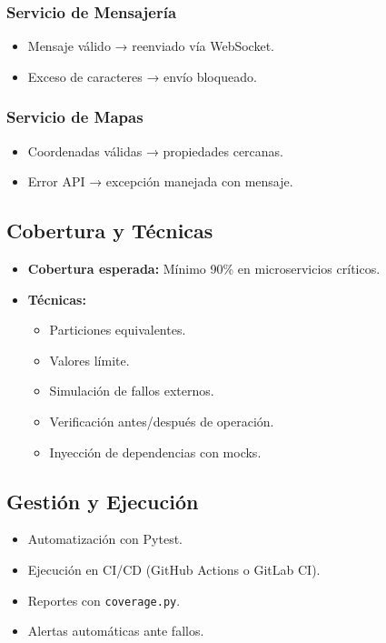 		\subsubsection*{Servicio de Mensajería}
			\begin{itemize}
				\item Mensaje válido → reenviado vía WebSocket.
				\item Exceso de caracteres → envío bloqueado.
			\end{itemize}
		
		\subsubsection*{Servicio de Mapas}
			\begin{itemize}
				\item Coordenadas válidas → propiedades cercanas.
				\item Error API → excepción manejada con mensaje.
			\end{itemize}
	
	\subsection*{Cobertura y Técnicas}
		\begin{itemize}
			\item \textbf{Cobertura esperada:} Mínimo 90\% en microservicios críticos.
			\item \textbf{Técnicas:}
			\begin{itemize}
				\item Particiones equivalentes.
				\item Valores límite.
				\item Simulación de fallos externos.
				\item Verificación antes/después de operación.
				\item Inyección de dependencias con mocks.
			\end{itemize}
		\end{itemize}
	
	\subsection*{Gestión y Ejecución}
		\begin{itemize}
			\item Automatización con Pytest.
			\item Ejecución en CI/CD (GitHub Actions o GitLab CI).
			\item Reportes con \texttt{coverage.py}.
			\item Alertas automáticas ante fallos.
		\end{itemize}
